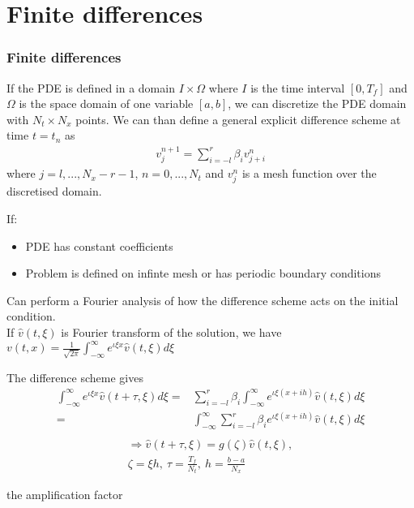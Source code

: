 \documentclass{beamer}
\begin{document}
\section{Finite differences}
\begin{frame}
\frametitle{Finite differences}
If the PDE is defined in a domain $I \times \Omega$ where $I$ is the time interval $[0, T_f]$ and $\Omega$ is the space domain of one variable $[a,b]$, we can discretize the PDE domain with $N_t \times N_x$ points. We can than define a general explicit difference scheme at time $t = t_n$ as
\begin{align*}
v_j^{n+1} = \sum_{i = -l}^r \beta_i v_{j+i}^n
\end{align*}
where $j = l, ..., N_x - r -1$, $n = 0, ..., N_t$ and $v_j^n$ is a mesh function over the discretised domain.
\end{frame}
\begin{frame}
If: \begin{itemize}
\item PDE has constant coefficients
\item Problem is defined on infinte mesh or has periodic boundary conditions
\end{itemize}
Can perform a Fourier analysis of how the difference scheme acts on the initial condition. \\ If $\hat{v}(t,\xi)$ is Fourier transform of the solution, we have $v(t,x) = \frac{1}{\sqrt{2\pi}}\int_{-\infty}^{\infty}e^{\iota\xi x}\hat{v}(t,\xi)d\xi$ \\
\end{frame}
\begin{frame}
The difference scheme gives
\begin{align*}
\int_{-\infty}^{\infty}e^{\iota\xi x}\hat{v}(t + \tau,\xi)d\xi = & \sum_{i=-l}^{r}\beta_i\int_{-\infty}^{\infty}e^{\iota\xi (x + ih)}\hat{v}(t,\xi)d\xi \\
= & \int_{-\infty}^{\infty} \sum_{i=-l}^{r}\beta_i e^{\iota\xi (x + ih)}\hat{v}(t,\xi)d\xi \\
\end{align*}
\begin{align*}
\Rightarrow \hat{v}(t + \tau, \xi) = g(\zeta)\hat{v}(t,\xi), \\
\zeta = \xi h, \ \tau = \frac{T_f}{N_t}, \ h = \frac{b - a}{N_x}
\end{align*}
\end{frame}
\begin{frame}
the amplification factor
\end{frame}
\end{document}

